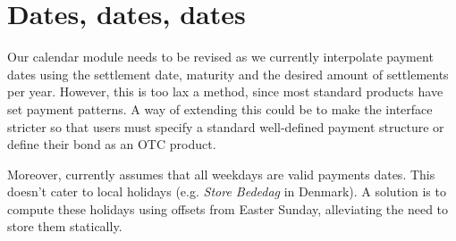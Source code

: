 \section{Dates, dates, dates}

Our calendar module needs to be revised as we currently interpolate 
payment dates using the settlement date, maturity and the desired amount of 
settlements per year. However, this is too lax a method, since most standard 
products have set payment patterns. A way of extending this could be to make
the interface stricter so that users must specify a standard well-defined
payment structure or define their bond as an OTC product.

Moreover, \hql currently assumes that all weekdays are valid payments dates. 
This doesn't cater to local holidays (e.g. \emph{Store Bededag} in Denmark). A 
solution is to compute these holidays using offsets from Easter Sunday, 
alleviating the need to store them statically.\\


